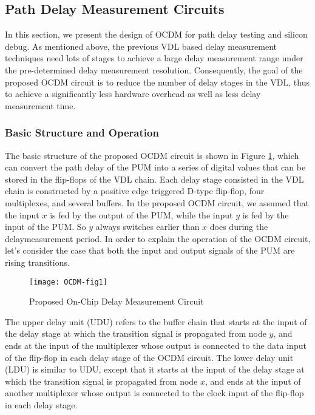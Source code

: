 \subsection{Path Delay Measurement Circuits}
In this section, we present the design of OCDM for path delay testing and silicon debug. As mentioned above, the previous VDL based delay measurement techniques need lots of stages to achieve a large delay measurement range under the pre-determined delay measurement resolution. Consequently, the goal of the proposed OCDM circuit is to reduce the number of delay stages in the VDL, thus to achieve a significantly less hardware overhead as well as less delay measurement time.

\subsubsection{Basic Structure and Operation}
The basic structure of the proposed OCDM circuit is shown in Figure \ref{fig:OCDM-fig1}, which can convert the path delay of the PUM into a series of digital values that can be stored in the flip-flops of the VDL chain. Each delay stage consisted in the VDL chain is constructed by a positive edge triggered D-type flip-flop, four multiplexes, and several buffers. In the proposed OCDM circuit, we assumed that the input $x$ is fed by the output of the PUM, while the input $y$ is fed by the input of the PUM. So $y$ always switches earlier than $x$ does during the delaymeasurement period. In order to explain the operation of the OCDM circuit, let’s consider the case that both the input and output signals of the PUM are rising transitions.

\begin{figure}[t]
\centering
\texttt{[image: OCDM-fig1]}
   \caption{Proposed On-Chip Delay Measurement Circuit}
    \label{fig:OCDM-fig1}
\end{figure}


The upper delay unit (UDU) refers to the buffer chain that starts at the input of the delay stage at which the transition signal is propagated from node $y$, and ends at the input of the multiplexer whose output is connected to the data input of the flip-flop in each delay stage of the OCDM circuit. The lower delay unit (LDU) is similar to UDU, except that it starts at the input of the delay stage at which the transition signal is propagated from node $x$, and ends at the input of another multiplexer whose output is connected to the clock input of the flip-flop in each delay stage.

